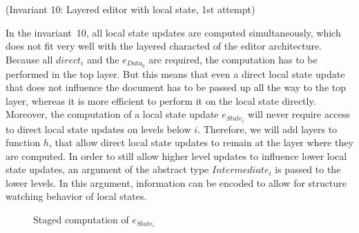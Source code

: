 \documentclass[twoside,epsf]{report}
\begin{document}
{\centering (Invariant 10: Layered editor with local state, 1st attempt)\\}\vspace{1em}




In the invariant~10, all local state updates are computed simultaneously, which does not fit very well with the layered characted of the editor architecture. Because all $direct_i$ and the $e_{Data_0}$ are required, the computation has to be performed in the top layer. But this means that even a direct local state update that does not influence the document has to be passed up all the way to the top layer, whereas it is more efficient to perform it on the local state directly. Moreover, the computation of a local state update $e_{State_i}$ will never require access to direct local state updates on levels below $i$. Therefore, we will add layers to function $h$, that allow direct local state updates to remain at the layer where they are computed. In order to still allow higher level updates  to influence lower local state updates, an argument of the abstract type $Intermediate_i$ is passed to the lower levels. In this argument, information can be encoded to allow for structure watching behavior of local states.
\begin{figure}
\begin{small}
\begin{center}
\begin{center}
\begin{small}
\bigskip \noindent
{}
\end{small}
\end{center}\caption{Staged computation of $e_{State_i}$ }\label{stagedh} 
\end{center}
\end{small}
\end{figure}
\end{document}
